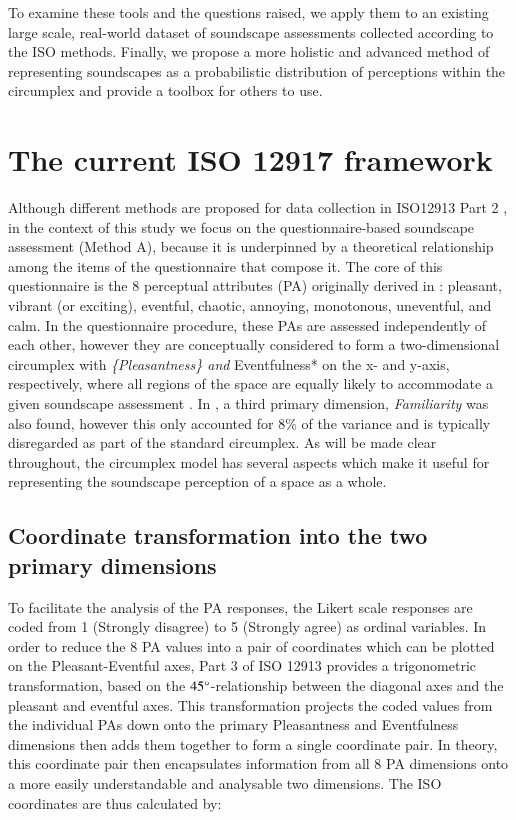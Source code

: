 \documentclass[
  authoryear,
  preprint,
  3p]{elsarticle}
\begin{document}
To examine these tools and the questions raised, we apply them to an
existing large scale, real-world dataset of soundscape assessments
collected according to the ISO methods. Finally, we propose a more
holistic and advanced method of representing soundscapes as a
probabilistic distribution of perceptions within the circumplex and
provide a toolbox for others to use.

\section{The current ISO 12917 framework}\label{sec-current}

Although different methods are proposed for data collection in ISO12913
Part 2 \citep{ISO12913_2}, in the context of this study we focus on the
questionnaire-based soundscape assessment (Method A), because it is
underpinned by a theoretical relationship among the items of the
questionnaire that compose it. The core of this questionnaire is the 8
perceptual attributes (PA) originally derived in
\citet{Axelsson2010Principal}: pleasant, vibrant (or exciting),
eventful, chaotic, annoying, monotonous, uneventful, and calm. In the
questionnaire procedure, these PAs are assessed independently of each
other, however they are conceptually considered to form a
two-dimensional circumplex with \emph{\{Pleasantness\} and
}Eventfulness* on the x- and y-axis, respectively, where all regions of
the space are equally likely to accommodate a given soundscape
assessment \citep{Aletta2016Soundscape}. In
\citet{Axelsson2010Principal}, a third primary dimension,
\emph{Familiarity} was also found, however this only accounted for 8\%
of the variance and is typically disregarded as part of the standard
circumplex. As will be made clear throughout, the circumplex model has
several aspects which make it useful for representing the soundscape
perception of a space as a whole.

\subsection{Coordinate transformation into the two primary
dimensions}\label{coordinate-transformation-into-the-two-primary-dimensions}

To facilitate the analysis of the PA responses, the Likert scale
responses are coded from 1 (Strongly disagree) to 5 (Strongly agree) as
ordinal variables. In order to reduce the 8 PA values into a pair of
coordinates which can be plotted on the Pleasant-Eventful axes, Part 3
of ISO 12913 \citep{ISO12913_3} provides a trigonometric transformation,
based on the \(45\degree\)-relationship between the diagonal axes and
the pleasant and eventful axes. This transformation projects the coded
values from the individual PAs down onto the primary Pleasantness and
Eventfulness dimensions then adds them together to form a single
coordinate pair. In theory, this coordinate pair then encapsulates
information from all 8 PA dimensions onto a more easily understandable
and analysable two dimensions. The ISO coordinates are thus calculated
by:
\end{document}
